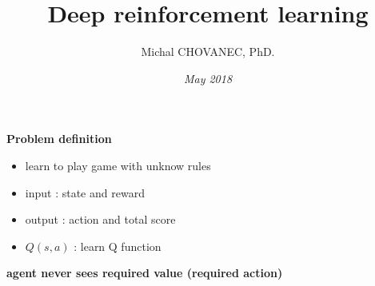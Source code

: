\documentclass[xcolor=dvipsnames]{beamer}
\title{\bf Deep reinforcement learning}
\author{Michal CHOVANEC, PhD.}
\date[EURP]{\it May 2018}
\begin{document}
\begin{frame}
\titlepage
{}
\end{frame}


\begin{frame}{\bf Problem definition}
\begin{itemize}
 \item learn to play game with unknow rules
 \item input  : state and reward
 \item output : action and total score
 \item $Q(s, a)$ : learn Q function
\end{itemize}
\centering

{\color{red} \bf agent never sees required value (required action)}



\end{frame}
\end{document}

